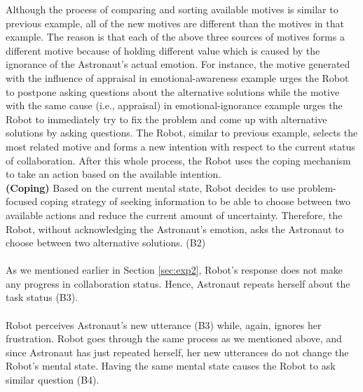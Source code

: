 Although the process of comparing and sorting available motives is similar to
previous example, all of the new motives are different than the motives in that
example. The reason is that each of the above three sources of motives forms a
different motive because of holding different value which is caused by the
ignorance of the Astronaut's actual emotion. For instance, the motive generated
with the influence of appraisal in emotional-awareness example urges the Robot
to postpone asking questions about the alternative solutions while the motive
with the same cause (i.e., appraisal) in emotional-ignorance example urges the
Robot to immediately try to fix the problem and come up with alternative
solutions by asking questions. The Robot, similar to previous example, selects
the most related motive and forms a new intention with respect to the current
status of collaboration. After this whole process, the Robot uses the coping
mechanism to take an action based on the available intention.\\

\noindent\textbf{(Coping)} Based on the current mental state, Robot decides to
use problem-focused coping strategy of seeking information to be able to choose
between two available actions and reduce the current amount of uncertainty.
Therefore, the Robot, without acknowledging the Astronaut's emotion, asks the
Astronaut to choose between two alternative solutions. (B2)\\

\noindent{}\\

As we mentioned earlier in Section \ref{sec:exp2}, Robot's response does not
make any progress in collaboration status. Hence, Astronaut repeats herself
about the task status (B3).\\

\noindent{}\\

Robot perceives Astronaut's new utterance (B3) while, again, ignores her
frustration. Robot goes through the same process as we mentioned above, and
since Astronaut has just repeated herself, her new utterances do not change the
Robot's mental state. Having the same mental state causes the Robot to ask
similar question (B4).\\

